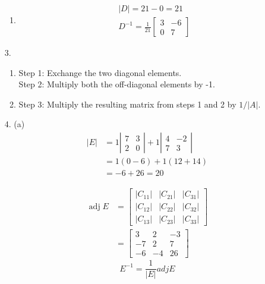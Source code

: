 \documentclass{./../../Latex/homework}
\begin{document}
\begin{enumerate}
\begin{enumerate}
\item $$
\begin{array}{l}
|D|=21-0=21 \\
D^{-1}=\frac{1}{21}\left[\begin{array}{rr}
3 & -6 \\
0 & 7
\end{array}\right]
\end{array}
$$
\end{enumerate}

\item[3.] 
\begin{enumerate}
\item Step 1: Exchange the two diagonal elements.\\
Step 2: Multiply both the off-diagonal elements by -1.

\item Step 3: Multiply the resulting matrix from steps 1 and 2 by \(1/|A|\).
\end{enumerate}

\item[4.] (a)$$
\begin{aligned}
|E| &=1\left|\begin{array}{ll}
7 & 3 \\
2 & 0
\end{array}\right|+1\left|\begin{array}{rr}
4 & -2 \\
7 & 3
\end{array}\right| \\
&=1(0-6)+1(12+14) \\
&=-6+26=20
\end{aligned}
$$

$$
\begin{aligned}
\operatorname{adj} E &=\left[\begin{array}{ccc}
\left|C_{11}\right| & \left|C_{21}\right| & \left|C_{31}\right| \\
\left|C_{12}\right| & \left|C_{22}\right| & \left|C_{32}\right| \\
\left|C_{13}\right| & \left|C_{23}\right| & \left|C_{33}\right|
\end{array}\right] \\
&=\left[\begin{array}{ccc}
3 & 2 & -3 \\
-7 & 2 & 7 \\
-6 & -4 & 26
\end{array}\right]
\end{aligned}
$$
$$ E^{-1}=\frac{1}{|E|} a d j E $$ 


\end{enumerate}
\end{document}
